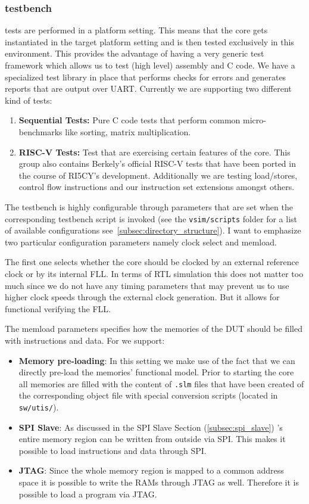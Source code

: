 \subsubsection{\pulpino testbench}

\pulpino tests are performed in a platform setting. This means that the core gets instantiated in the target platform setting and is then tested exclusively in this environment. This provides the advantage of having a very generic test framework which allows us to test (high level) assembly and C code. We have a specialized test library in place that performs checks for errors and generates reports that are output over UART. Currently we are supporting two different kind of tests:
\begin{enumerate}
    \item \textbf{Sequential Tests:} Pure C code tests that perform common micro-benchmarks like sorting, matrix multiplication.
    \item \textbf{RISC-V Tests:} Test that are exercising certain features of the core. This group also contains Berkely's official RISC-V tests that have been ported in the course of RI5CY's development. Additionally we are testing load/stores, control flow instructions and our instruction set extensions amongst others.
\end{enumerate}

The testbench is highly configurable through parameters that are set when the corresponding testbench script is invoked (see the \verb+vsim/scripts+ folder for a list of available configurations see~\ref{subsec:directory_structure}). I want to emphasize two particular configuration parameters namely clock select and memload. 

The first one selects whether the core should be clocked by an external reference clock or by its internal FLL. In terms of RTL simulation this does not matter too much since we do not have any timing parameters that may prevent us to use higher clock speeds through the external clock generation. But it allows for functional verifying the FLL.

The memload parameters specifies how the memories of the DUT should be filled with instructions and data. For \pulpino we support:
\begin{itemize}
    \item \textbf{Memory pre-loading}: In this setting we make use of the fact that we can directly pre-load the memories' functional model. Prior to starting the core all memories are filled with the content of \verb+.slm+ files that have been created of the corresponding object file with special conversion scripts (located in \verb+sw/utis/+).
    \item \textbf{SPI Slave}: As discussed in the SPI Slave Section (\ref{subsec:spi_slave}) \pulpino's entire memory region can be written from outside via SPI. This makes it possible to load instructions and data through SPI.
    \item \textbf{JTAG}: Since the whole memory region is mapped to a common address space it is possible to write the RAMs through JTAG as well. Therefore it is possible to load a program via JTAG.
\end{itemize}

